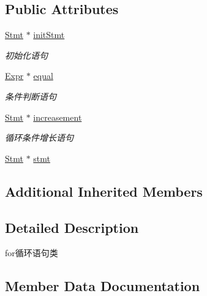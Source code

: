 \subsection*{Public Attributes}
\begin{DoxyCompactItemize}
\item 
\mbox{\label{class_for_a056889fe255686012e6a9197c2d514e7}} 
\hyperlink{class_stmt}{Stmt} $\ast$ \hyperlink{class_for_a056889fe255686012e6a9197c2d514e7}{init\+Stmt}
\begin{DoxyCompactList}\small\item\em 初始化语句 \end{DoxyCompactList}\item 
\mbox{\label{class_for_a215e09b14cddca31190dc69cd783d886}} 
\hyperlink{class_expr}{Expr} $\ast$ \hyperlink{class_for_a215e09b14cddca31190dc69cd783d886}{equal}
\begin{DoxyCompactList}\small\item\em 条件判断语句 \end{DoxyCompactList}\item 
\mbox{\label{class_for_a2d0ace8af086310ef5a11d9641dc81e6}} 
\hyperlink{class_stmt}{Stmt} $\ast$ \hyperlink{class_for_a2d0ace8af086310ef5a11d9641dc81e6}{increasement}
\begin{DoxyCompactList}\small\item\em 循环条件增长语句 \end{DoxyCompactList}\item 
\hyperlink{class_stmt}{Stmt} $\ast$ \hyperlink{class_for_af269abab55eae120cccbd1c76b0c5011}{stmt}
\end{DoxyCompactItemize}
\subsection*{Additional Inherited Members}


\subsection{Detailed Description}
for循环语句类 

\subsection{Member Data Documentation}
\mbox{\label{class_for_af269abab55eae120cccbd1c76b0c5011}} 
